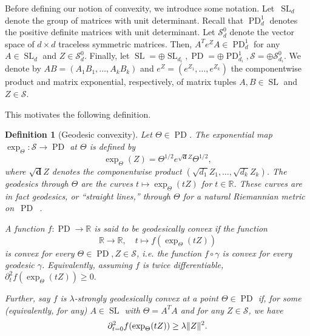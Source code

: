 \documentclass{article}
\newtheorem{definition}{Definition}
\DeclarePairedDelimiter{\norm}{\lVert}{\rVert}
\newcommand{\R}{{\mathbb{R}}}
\renewcommand{\vec}{\bm}
\newcommand\SL{\operatorname{SL}}
\newcommand\PD{\operatorname{PD}}
\newcommand\Sym{\mathcal{S}}
\newcommand\tr{\operatorname{Tr}}
\newcommand{\CF}[1]{{\color{purple}[CF: #1]}}
\begin{document}
Before defining our notion of convexity, we introduce some notation.
Let~$\SL_d$ denote the group of matrices with unit determinant.
Recall that $\PD_d^1$ denotes the positive definite matrices with unit determinant.
Let $\Sym_d^0$ denote the vector space of $d\times d$ traceless symmetric matrices.
Then, $A^T e^Z A \in \PD_d^1$ for any $A \in \SL_d$ and $Z\in\Sym_d^0$.
Finally, let $\SL = \oplus \SL_{d_i}, \PD = \oplus \PD_{d_i}^1, \Sym = \oplus \Sym_{d_i}^0$. We denote by $AB=(A_1B_1,\dots,A_kB_k)$ and $e^Z=(e^{Z_1},\dots,e^{Z_k})$ the componentwise product and matrix exponential, respectively, of matrix tuples $A, B \in \SL$ and $Z\in\Sym$.

This motivates the following definition.

\begin{definition}[Geodesic convexity]\label{dfn:g-convexity}
 Let $\Theta \in \PD$. The \emph{exponential map} $\exp_\Theta:\Sym \to \PD$ at $\Theta$ is defined by 
$$ \exp_\Theta(Z) = \Theta^{1/2} e^{\sqrt{\vec d}Z} \Theta^{1/2},$$
where $\sqrt{\vec d} Z$ denotes the componentwise product $(\sqrt{d_1} Z_1, \dots, \sqrt{d_k}Z_k)$.
The \emph{geodesics} through $\Theta$ are the curves $t\mapsto \exp_\Theta(tZ)$ for $t \in \R$. These curves are in fact geodesics, or ``straight lines,'' through $\Theta$ for a natural Riemannian metric on~$\PD$~\cite{bhatia2009positive}.


A function $f\colon \PD \to \R$ is said to be \emph{geodesically convex} if the function 
$$\R \to \R, \quad t \mapsto f (\exp_\Theta( tZ))$$ is convex for every $\Theta \in \PD, Z \in \Sym$, i.e. the function $f \circ \gamma$ is convex for every geodesic $\gamma$. Equivalently, assuming $f$ is twice differentiable, $\partial^2_t f(\exp_\Theta(tZ)) \geq 0.$ 

Further, say $f$ is \emph{$\lambda$-strongly geodesically convex} at a point $\Theta \in \PD$ if, for some (equivalently, for any) $A \in \SL$ with $\Theta = A^T A$ and for any $Z \in \Sym$, we have
\begin{align*}
  \partial^2_{t=0} f(\exp_\Theta(tZ)) \geq \lambda \norm{Z}^2.
\end{align*}
\end{definition}
\end{document}
